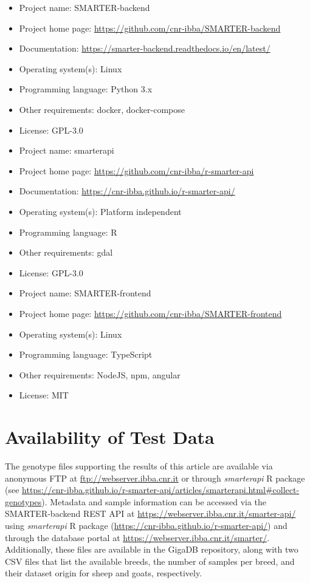 \documentclass[a4paper,num-refs,gigabyte]{oup-contemporary}
\begin{document}
\begin{itemize}
\item Project name: SMARTER-backend
\item Project home page: \url{https://github.com/cnr-ibba/SMARTER-backend}
\item Documentation: \url{https://smarter-backend.readthedocs.io/en/latest/}
\item Operating system(s): Linux
\item Programming language: Python 3.x
\item Other requirements: docker, docker-compose
\item License: GPL-3.0
\end{itemize}

\begin{itemize}
\item Project name: smarterapi
\item Project home page: \url{https://github.com/cnr-ibba/r-smarter-api}
\item Documentation: \url{https://cnr-ibba.github.io/r-smarter-api/}
\item Operating system(s): Platform independent
\item Programming language: R
\item Other requirements: gdal
\item License: GPL-3.0
\end{itemize}

\begin{itemize}
\item Project name: SMARTER-frontend
\item Project home page: \url{https://github.com/cnr-ibba/SMARTER-frontend}
\item Operating system(s): Linux
\item Programming language: TypeScript
\item Other requirements: NodeJS, npm, angular
\item License: MIT
\end{itemize}


\section{Availability of Test Data}

The genotype files supporting the results of this article are available via anonymous FTP at \url{ftp://webserver.ibba.cnr.it} or through \emph{smarterapi} R package (see \url{https://cnr-ibba.github.io/r-smarter-api/articles/smarterapi.html#collect-genotypes}). Metadata and sample information can be accessed via the SMARTER-backend REST API at \url{https://webserver.ibba.cnr.it/smarter-api/} using \emph{smarterapi} R package (\url{https://cnr-ibba.github.io/r-smarter-api/}) and through the database portal at \url{https://webserver.ibba.cnr.it/smarter/}.
Additionally, these files are available in the GigaDB\citep{SUPPORTData} repository, along with two CSV files that list the available breeds, the number of samples per breed, and their dataset origin for sheep and goats, respectively.
\end{document}

